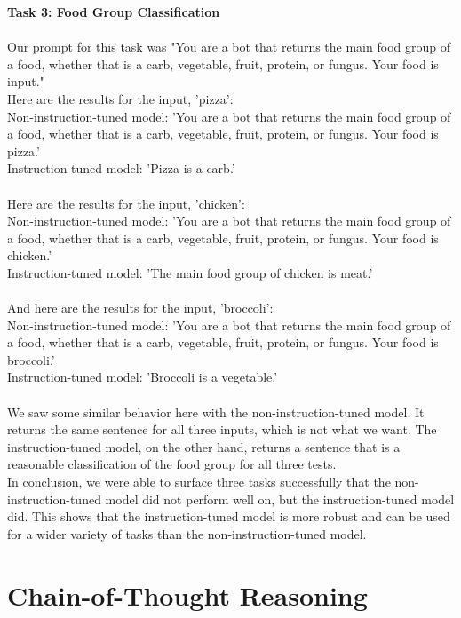 \documentclass{article}
\begin{document}
\textbf{Task 3: Food Group Classification}\\\\
Our prompt for this task was "You are a bot that returns the main food group of a food, whether that is a carb, vegetable, fruit, protein, or fungus. Your food is {input}."\\
\indent Here are the results for the input, 'pizza':\\
\indent \indent Non-instruction-tuned model: 'You are a bot that returns the main food group of a food, whether that is a carb, vegetable, fruit, protein, or fungus. Your food is pizza.'\\
\indent \indent Instruction-tuned model: 'Pizza is a carb.'\\\\
\indent Here are the results for the input, 'chicken':\\
\indent \indent Non-instruction-tuned model: 'You are a bot that returns the main food group of a food, whether that is a carb, vegetable, fruit, protein, or fungus. Your food is chicken.'\\
\indent \indent Instruction-tuned model: 'The main food group of chicken is meat.'\\\\
\indent And here are the results for the input, 'broccoli':\\
\indent \indent Non-instruction-tuned model: 'You are a bot that returns the main food group of a food, whether that is a carb, vegetable, fruit, protein, or fungus. Your food is broccoli.'\\
\indent \indent Instruction-tuned model: 'Broccoli is a vegetable.'\\\\
We saw some similar behavior here with the non-instruction-tuned model. It returns the same sentence for all three inputs, which is not what we want. The instruction-tuned model, on the other hand, returns a sentence that is a reasonable classification of the food group for all three tests.\\

In conclusion, we were able to surface three tasks successfully that the non-instruction-tuned model did not perform well on, but the instruction-tuned model did. This shows that the instruction-tuned model is more robust and can be used for a wider variety of tasks than the non-instruction-tuned model.\\

\section{Chain-of-Thought Reasoning}
\setcounter{subsection}{0}
\end{document}
